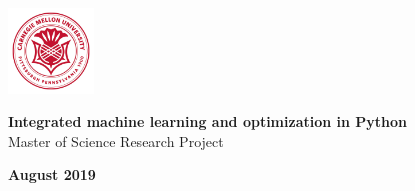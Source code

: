 \begin{titlepage}
    \vbox{}
  
    \begin{center}
    \includegraphics[width=0.17\textwidth]{logo.png}\\[2.5cm]
    \end{center}
  
    \begin{center}
    {\large\textbf{Integrated machine learning \vspace{7.5pt} and optimization in Python}}\\[1.5cm]
    
    Master of Science Research Project
    \begin{center}
      \bfseries\large{August 2019}\end{center}
    \end{center}
    
\end{titlepage}